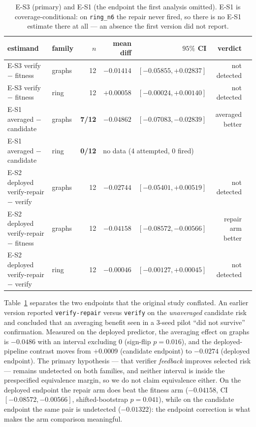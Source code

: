 \documentclass{neurips_2024}
\begin{document}
\begin{table}[t]
\centering
\caption{E-S3 (primary) and E-S1 (the endpoint the first analysis omitted). E-S1 is
coverage-conditional: on \texttt{ring\_n6} the repair never fired, so there is no E-S1
estimate there at all --- an absence the first version did not report.}
\label{tab:search}
\small
\begin{tabular}{@{}llrrrrl@{}}
\toprule
estimand & family & $n$ & mean diff & $95\%$ CI & verdict \\
\midrule
E-S3 verify $-$ fitness & graphs & 12 & $-0.01414$ & $[-0.05855,+0.02837]$ & not detected \\
E-S3 verify $-$ fitness & ring   & 12 & $+0.00058$ & $[-0.00024,+0.00140]$ & not detected \\
\midrule
E-S1 averaged $-$ candidate & graphs & \textbf{7/12} & $\mathbf{-0.04862}$ & $[-0.07083,-0.02839]$ & averaged better \\
E-S1 averaged $-$ candidate & ring & \textbf{0/12} & \multicolumn{3}{l}{no data (4 attempted, 0 fired)} \\
\midrule
E-S2 deployed verify-repair $-$ verify & graphs & 12 & $-0.02744$ & $[-0.05401,+0.00519]$ & not detected \\
E-S2 deployed verify-repair $-$ fitness & graphs & 12 & $-0.04158$ & $[-0.08572,-0.00566]$ & repair arm better \\
E-S2 deployed verify-repair $-$ verify & ring   & 12 & $-0.00046$ & $[-0.00127,+0.00045]$ & not detected \\
\bottomrule
\end{tabular}
\end{table}

Table~\ref{tab:search} separates the two endpoints that the original study conflated. An
earlier version reported
\texttt{verify-repair} versus \texttt{verify} on the \emph{unaveraged} candidate risk and
concluded that an averaging benefit seen in a $3$-seed pilot ``did not survive''
confirmation. Measured on the deployed predictor, the averaging effect on graphs is
$-0.0486$ with an interval excluding $0$ (sign-flip $p{=}0.016$), and the deployed-pipeline
contrast moves from $+0.0009$ (candidate endpoint) to $-0.0274$ (deployed endpoint). The
primary hypothesis --- that verifier \emph{feedback} improves selected risk --- remains
undetected on both families, and neither interval is inside the prespecified equivalence
margin, so we do not claim equivalence either. On the deployed endpoint the repair arm does
beat the fitness arm ($-0.04158$, CI $[-0.08572,-0.00566]$, shifted-bootstrap $p{=}0.041$),
while on the candidate endpoint the same pair is undetected ($-0.01322$): the endpoint
correction is what makes the arm comparison meaningful.
\end{document}

